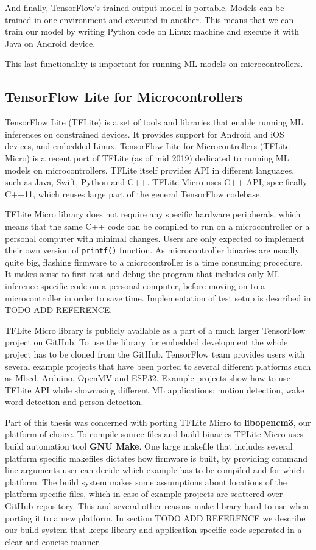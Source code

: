 And finally, TensorFlow's trained output model is portable\cite{geron}.
Models can be trained in one environment and executed in another.
This means that we can train our model by writing Python code on Linux machine and execute it with Java on Android device.

This last functionality is important for running ML models on microcontrollers.

\subsection{ TensorFlow Lite for Microcontrollers}

TensorFlow Lite (TFLite) is a set of tools and libraries that enable running ML inferences on constrained devices\cite{tensorflow_github}.
It provides support for Android and iOS devices, and embedded Linux.
TensorFlow Lite for Microcontrollers (TFLite Micro) is a recent port of TFLite (as of mid 2019) dedicated to running ML models on microcontrollers.
TFLite itself provides API in different languages, such as Java, Swift, Python and C++.
TFLite Micro uses C++ API, specifically C++11, which reuses large part of the general TensorFlow codebase.

TFLite Micro library does not require any specific hardware peripherals, which means that the same C++ code can be compiled to run on a microcontroller or a personal computer with minimal changes.
Users are only expected to implement their own version of \verb|printf()| function.
As microcontroller binaries are usually quite big, flashing firmware to a microcontroller is a time consuming procedure.
It makes sense to first test and debug the program that includes only ML inference specific code on a personal computer, before moving on to a microcontroller in order to save time.
Implementation of test setup is described in TODO ADD REFERENCE.

TFLite Micro library is publicly available as a part of a much larger TensorFlow project on GitHub\cite{tensorflow_github}.
To use the library for embedded development the whole project has to be cloned from the GitHub.
TensorFlow team provides users with several example projects that have been ported to several different platforms such as Mbed, Arduino, OpenMV and ESP32.
Example projects show how to use TFLite API while showcasing different ML applications: motion detection, wake word detection and person detection.

Part of this thesis was concerned with porting TFLite Micro to \textbf{libopencm3}, our platform of choice.
To compile source files and build binaries TFLite Micro uses build automation tool \textbf{GNU Make}.
One large makefile that includes several platform specific makefiles dictates how firmware is built, by providing command line arguments user can decide which example has to be compiled and for which platform.
The build system makes some assumptions about locations of the platform specific files, which in case of example projects are scattered over GitHub repository.
This and several other reasons make library hard to use when porting it to a new platform.
In section TODO ADD REFERENCE we describe our build system that keeps library and application specific code separated in a clear and concise manner.

